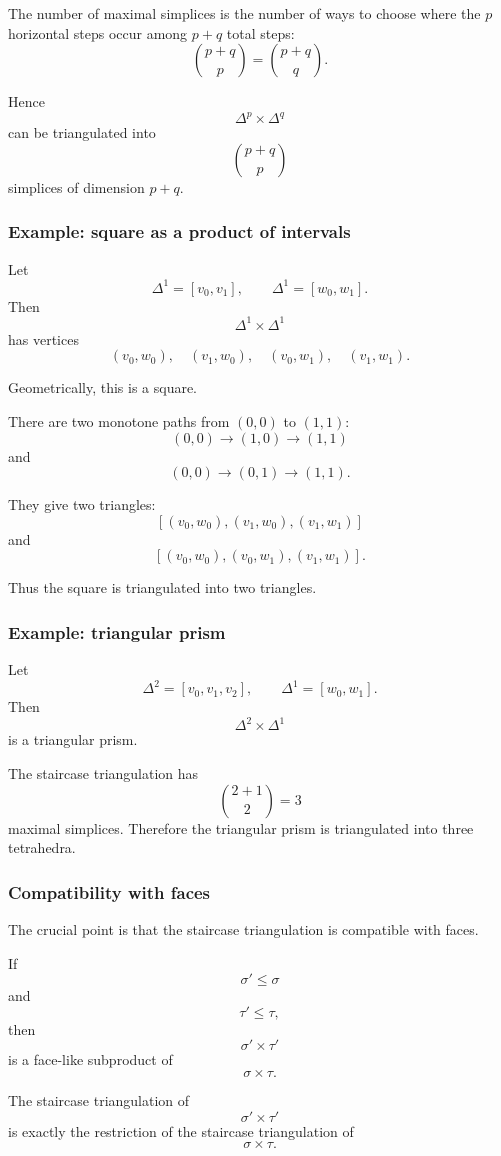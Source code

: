\documentclass[12pt,a4paper]{article}
\theoremstyle{notespace}
\begin{document}
The number of maximal simplices is the number of ways to choose where the \(p\) horizontal steps occur among \(p+q\) total steps:
\[
\binom{p+q}{p}
=
\binom{p+q}{q}.
\]

Hence
\[
\Delta^p\times \Delta^q
\]
can be triangulated into
\[
\binom{p+q}{p}
\]
simplices of dimension \(p+q\).

\subsubsection{Example: square as a product of intervals}

Let
\[
\Delta^1=[v_0,v_1],
\qquad
\Delta^1=[w_0,w_1].
\]
Then
\[
\Delta^1\times \Delta^1
\]
has vertices
\[
(v_0,w_0),\quad
(v_1,w_0),\quad
(v_0,w_1),\quad
(v_1,w_1).
\]

Geometrically, this is a square.

There are two monotone paths from \((0,0)\) to \((1,1)\):
\[
(0,0)\to (1,0)\to (1,1)
\]
and
\[
(0,0)\to (0,1)\to (1,1).
\]

They give two triangles:
\[
[(v_0,w_0),(v_1,w_0),(v_1,w_1)]
\]
and
\[
[(v_0,w_0),(v_0,w_1),(v_1,w_1)].
\]

Thus the square is triangulated into two triangles.

\subsubsection{Example: triangular prism}

Let
\[
\Delta^2=[v_0,v_1,v_2],
\qquad
\Delta^1=[w_0,w_1].
\]
Then
\[
\Delta^2\times \Delta^1
\]
is a triangular prism.

The staircase triangulation has
\[
\binom{2+1}{2}=3
\]
maximal simplices. Therefore the triangular prism is triangulated into three tetrahedra.

\subsubsection{Compatibility with faces}

The crucial point is that the staircase triangulation is compatible with faces.

If
\[
\sigma'\leq \sigma
\]
and
\[
\tau'\leq \tau,
\]
then
\[
\sigma'\times \tau'
\]
is a face-like subproduct of
\[
\sigma\times \tau.
\]

The staircase triangulation of
\[
\sigma'\times \tau'
\]
is exactly the restriction of the staircase triangulation of
\[
\sigma\times \tau.
\]
\end{document}
